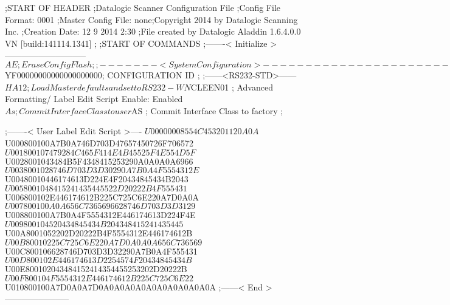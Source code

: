 ;START OF HEADER
;Datalogic Scanner Configuration File
;Config File Format: 0001
;Master Config File: none;Copyright 2014 by Datalogic Scanning Inc.
;Creation Date: 12 9 2014 2:30
;File created by Datalogic Aladdin 1.6.4.0.0 VN [build:141114.1341]
;
;START OF COMMANDS
;-------< Initialize >-----------------------------
$AE                 ; Erase Config Flash
;
;-------< System Configuration >-------------------------------
$YF00000000000000000000; CONFIGURATION ID
;
;------<RS232-STD>------
$HA12               ; Load Master defaults and set to RS232-WN
$CLEEN01            ; Advanced Formatting/ Label Edit Script Enable: Enabled
$As                 ; Commit Interface Class to user
$AS                 ; Commit Interface Class to factory
;

;-------< User Label Edit Script >----
$U00000008554C453201120A0A
$U000800100A7B0A746D703D47657450726F706572
$U001800107479284C465F414E4B45525F4E554D5F
$U0028001043484B5F4348415253290A0A0A0A6966
$U0038001028746D703D3D30290A7B0A4F5554312E
$U00480010446174613D224E4F20434845434B2043
$U0058001048415241435445522D20222B4F555431
$U006800102E446174612B225C725C6E220A7D0A0A
$U007800100A0A656C7365696628746D703D3D3129
$U008800100A7B0A4F5554312E446174613D224F4E
$U009800104520434845434B204348415241435445
$U00A8001052202D20222B4F5554312E446174612B
$U00B80010225C725C6E220A7D0A0A0A656C736569
$U00C800106628746D703D3D32290A7B0A4F555431
$U00D800102E446174613D2254574F20434845434B
$U00E800102043484152414354455253202D20222B
$U00F800104F5554312E446174612B225C725C6E22
$U010800100A7D0A0A7D0A0A0A0A0A0A0A0A0A0A0A
;------< End >-----------------------

